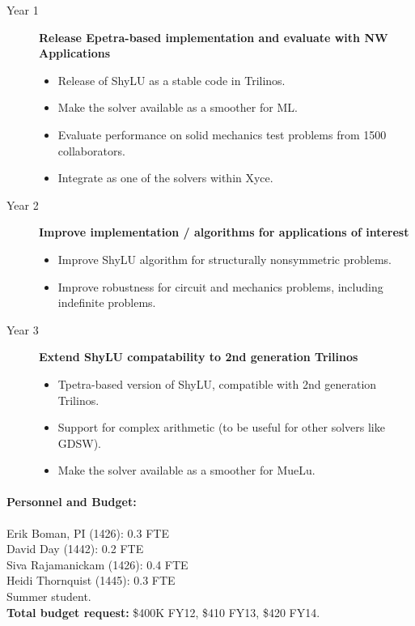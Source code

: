 \documentclass[10pt]{amsart}
\begin{document}
\begin{description}
\item[Year 1] {\bf Release Epetra-based implementation and evaluate with NW Applications}
  \begin{itemize} 
  \item Release of ShyLU as a stable code in Trilinos.
  \item Make the solver available as a smoother for ML.
  \item Evaluate performance on solid mechanics test problems from 1500 collaborators.
  \item Integrate as one of the solvers within Xyce.
  \end{itemize}
\item[Year 2] {\bf Improve implementation / algorithms for applications of interest}
  \begin{itemize}
  \item Improve ShyLU algorithm for structurally nonsymmetric problems.
  \item Improve robustness for circuit and mechanics problems, including indefinite problems.
  \end{itemize}
\item[Year 3] {\bf Extend ShyLU compatability to 2nd generation Trilinos}
  \begin{itemize}
  \item Tpetra-based version of ShyLU, compatible with 2nd generation Trilinos.
  \item Support for complex arithmetic (to be useful for other solvers like GDSW).
  \item Make the solver available as a smoother for MueLu.
  \end{itemize}
\end{description}


\paragraph{\bf Personnel and Budget:}
Erik Boman, PI (1426): 0.3 FTE\\
David Day (1442): 0.2 FTE\\
Siva Rajamanickam (1426): 0.4 FTE\\
Heidi Thornquist (1445): 0.3 FTE\\
Summer student.\\
%
\textbf{Total budget request:} \$400K FY12, \$410 FY13, \$420 FY14.
\end{document}
